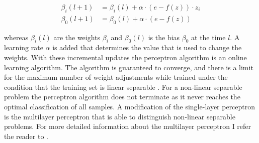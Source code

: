 \begin{align*}
\beta_i(l+1) &= \beta_i(l) + \alpha \cdot (e - f(z)) \cdot z_i\\
\beta_0(l+1) &= \beta_0(l) + \alpha \cdot (e - f(z))
\end{align*}

whereas $\beta_i(l)$ are the weights $\beta_i$ and $\beta_0(l)$ is the bias $\beta_0$ at the time $l$.
A learning rate $\alpha$ is added that determines the value that is used to change the weights.
With these incremental updates the perceptron algorithm is an online learning algorithm.
The algorithm is guaranteed to converge, and there is a limit for the maximum number of weight adjustments while trained under the condition that the training set is linear separable \cite{2016Perceptron}.
For a non-linear separable problem the perceptron algorithm does not terminate as it never reaches the optimal classification of all samples. %
A modification of the single-layer perceptron is the multilayer perceptron that is able to distinguish non-linear separable problems.
For more detailed information about the multilayer perceptron I refer the reader to \cite{2017MultilayerPerceptron}.











